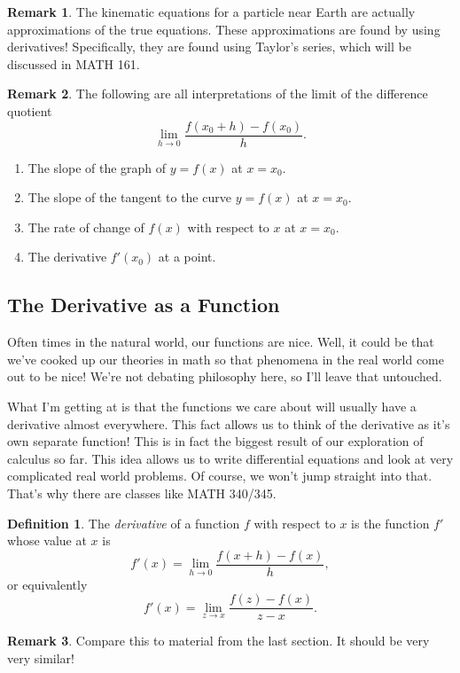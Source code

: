 \documentclass[leqno]{article}
\theoremstyle{definition}
\newtheorem{definition}{Definition}[section]
\newtheorem{remark}{Remark}[section]
\theoremstyle{remark}
\theoremstyle{theorem}
\begin{document}
\begin{remark}
The kinematic equations for a particle near Earth are actually approximations of the true equations.  These approximations are found by using derivatives!  Specifically, they are found using Taylor's series, which will be discussed in MATH 161.
\end{remark}

\begin{remark}
The following are all interpretations of the limit of the difference quotient
\[
\lim_{h\to 0} \frac{f(x_0+h)-f(x_0)}{h}.
\]
\begin{enumerate}[1.]
\item The slope of the graph of $y=f(x)$ at $x=x_0$.
\item The slope of the tangent to the curve $y=f(x)$ at $x=x_0$.
\item The rate of change of $f(x)$ with respect to $x$ at $x=x_0$.
\item The derivative $f'(x_0)$ at a point.
\end{enumerate}
\end{remark}

\subsection{The Derivative as a Function}

Often times in the natural world, our functions are nice.  Well, it could be that we've cooked up our theories in math so that phenomena in the real world come out to be nice!  We're not debating philosophy here, so I'll leave that untouched.

What I'm getting at is that the functions we care about will usually have a derivative almost everywhere.  This fact allows us to think of the derivative as it's own separate function! This is in fact the biggest result of our exploration of calculus so far.  This idea allows us to write differential equations and look at very complicated real world problems.  Of course, we won't jump straight into that.  That's why there are classes like MATH 340/345.

\begin{definition}
The \emph{derivative} of a function $f$ with respect to $x$ is the function $f'$ whose value at $x$ is
\[
f'(x)=\lim_{h\to 0} \frac{f(x+h)-f(x)}{h},
\]
or equivalently
\[
f'(x)=\lim_{z\to x} \frac{f(z)-f(x)}{z-x}.
\]
\end{definition}

\begin{remark}
Compare this to material from the last section.  It should be very very similar!
\end{remark}
\end{document}

